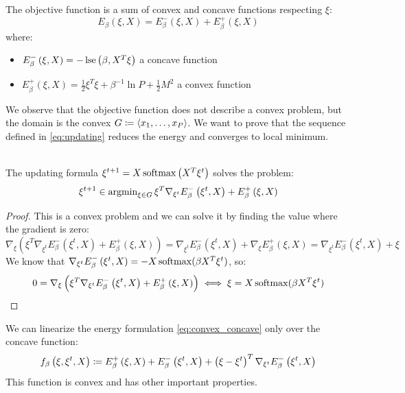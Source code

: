 \noindent The objective function is a sum of convex and concave functions respecting $\xi$:
\begin{equation}
	\label{eq:convex_concave}
	E_\beta\left(\xi,X\right) = E_\beta^{-}\left(\xi,X\right) + E_\beta^{+}\left(\xi,X\right)
\end{equation}
where:
\begin{itemize}[itemsep=2pt, topsep=10pt]
	\item $E_\beta^{-}\left(\xi,X\right) = -\operatorname{lse}\left(\beta, X^T\xi\right)$ a concave function
	\item $E_\beta^{+}\left(\xi,X\right) = \frac12\xi^T\xi + \beta^{-1}\ln P + \frac12 M^2$ a convex function
\end{itemize}
We observe that the objective function does not describe a convex problem, but the domain is the convex $G\coloneqq\langle{x_1,\ldots,x_P}\rangle$. We want to prove that the sequence defined in \cref{eq:updating} reduces the energy and converges to local minimum.
\begin{proposition} \\
	\label{prop:convex_problem}
	The updating formula $\xi^{t+1} = X\operatorname{softmax}\left(X^T\xi^{t}\right)$ solves the problem:
	\[
	\xi^{t+1}\in\operatorname{argmin}_{\xi\in G} \xi^T\nabla_{\xi^{t}}E_\beta^{-}\left(\xi^{t},X\right) + E_\beta^{+}\left(\xi,X\right)
	\]
	\begin{proof}
		This is a convex problem and we can solve it by finding the value where the gradient is zero:
		\[
		\nabla_{\xi}\left(\xi^T\nabla_{\xi^{t}}E_\beta^{-}\left(\xi^{t},X\right) + E_\beta^{+}\left(\xi,X\right)\right) = \nabla_{\xi^{t}}E_\beta^{-}\left(\xi^{t},X\right) + \nabla_{\xi}E_\beta^{+}\left(\xi,X\right) = \nabla_{\xi^{t}}E_\beta^{-}\left(\xi^{t},X\right) + \xi
		\]
		We know that $\nabla_{\xi^{t}}E_\beta^{-}\left(\xi^{t},X\right) = -X\operatorname{softmax}(\beta X^T\xi^t)$, so:
		\[
		0 = \nabla_{\xi}\left(\xi^T\nabla_{\xi^{t}}E_\beta^{-}\left(\xi^{t},X\right) + E_\beta^{+}\left(\xi,X\right)\right) \iff \xi = X\operatorname{softmax}(\beta X^T\xi^t)
		\]
	\end{proof}
\end{proposition}
\begin{remark}
	We can linearize the energy formulation \cref{eq:convex_concave} only over the concave function:
	\[
	f_{\beta}\left(\xi,\xi^{t},X\right) \coloneqq E_\beta^{+}\left(\xi,X\right) + E_\beta^{-}\left(\xi^{t},X\right) + \left(\xi-\xi^{t}\right)^T\nabla_{\xi^{t}}E_\beta^{-}\left(\xi^{t},X\right)
	\]
	This function is convex and has other important properties.
\end{remark}
